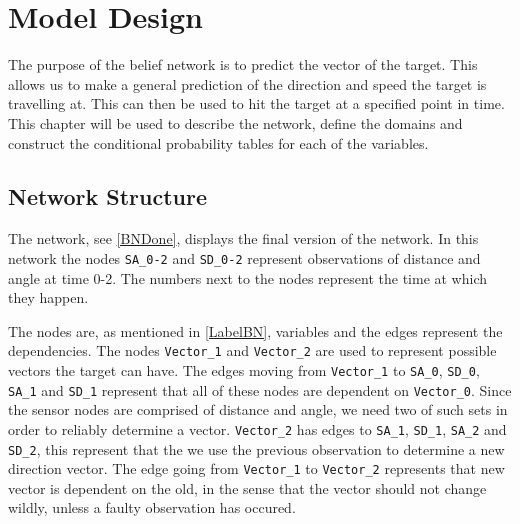 \chapter{Model Design}

The purpose of the belief network is to predict the vector of the
target. This allows us to make a general prediction of the direction and speed
the target is travelling at. This can then be used to hit the target at a
specified point in time. This chapter will be used to describe the network,
define the domains and construct the conditional probability tables for each of
the variables.

\section{Network Structure}
The network, see \autoref{BNDone}, displays the final version of the network.
In this network the nodes \texttt{SA\_0-2} and \texttt{SD\_0-2} represent
observations of distance and angle at time 0-2. The numbers next to the nodes
represent the time at which they happen.



The nodes are, as mentioned in \autoref{LabelBN}, variables and the edges
represent the dependencies. The nodes \texttt{Vector\_1} and \texttt{Vector\_2}
are used to represent possible vectors the target can have. The edges moving
from \texttt{Vector\_1} to \texttt{SA\_0}, \texttt{SD\_0}, \texttt{SA\_1} and
\texttt{SD\_1} represent that all of these nodes are dependent on
\texttt{Vector\_0}. 
Since the sensor nodes are comprised of distance and angle, we need two
of such sets in order to reliably determine a vector. \texttt{Vector\_2} has
edges to \texttt{SA\_1}, \texttt{SD\_1}, \texttt{SA\_2} and
\texttt{SD\_2}, this represent that the we use the
previous observation to determine a new direction vector. The edge going from
 \texttt{Vector\_1} to \texttt{Vector\_2} represents that new vector is
 dependent on the old, in the sense that the vector should not change wildly,
 unless a faulty observation has occured. 
